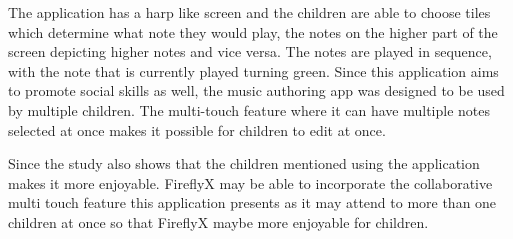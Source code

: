 The application has a harp like screen and the children are able to choose tiles which determine what note they would play, the notes on the higher part of the screen depicting higher notes and vice versa. The notes are played in sequence, with the note that is currently played turning green. Since this application aims to promote social skills as well, the music authoring app was designed to be used by multiple children. The multi-touch feature where it can have multiple notes selected at once makes it possible for children to edit at once. 

Since the study also shows that the children mentioned using the application makes it more enjoyable. FireflyX may be able to incorporate the collaborative multi touch feature this application presents as it may attend to more than one children at once so that FireflyX maybe more enjoyable for children.





